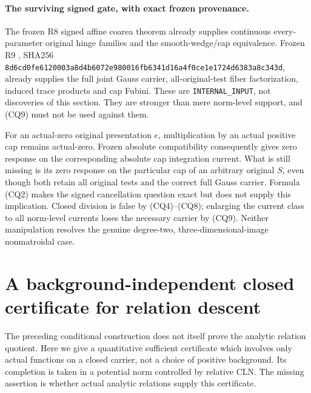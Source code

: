 \documentclass[11pt,a4paper]{article}
\numberwithin{equation}{section}
\theoremstyle{definition}
\theoremstyle{remark}
\begin{document}
\paragraph{The surviving signed gate, with exact frozen provenance.}
The frozen R8 signed affine coarea theorem already supplies
continuous every-parameter original hinge families and the
smooth-wedge/cap equivalence. Frozen R9
,
SHA256
{\small\nolinkurl{8d6cd0fe6120003a8d4b6072e980016fb6341d16a4f0ce1e1724d6383a8c343d}},
already supplies the full joint Gauss carrier, all-original-test
fiber factorization, induced trace products and cap Fubini.
These are \texttt{INTERNAL\_INPUT}, not discoveries of this section.
They are stronger than mere norm-level support, and (CQ9) must not
be used against them.

For an actual-zero original presentation \(e\), multiplication
by an actual positive cap remains actual-zero. Frozen absolute
compatibility consequently gives zero response on the corresponding
absolute cap integration current. What is still missing is its
zero response on the particular cap of an arbitrary original
\(S\), even though both retain all original tests and the correct
full Gauss carrier. Formula (CQ2) makes the signed cancellation
question exact but does not supply this implication. Closed
division is false by (CQ4)--(CQ8); enlarging the current class to
all norm-level currents loses the necessary carrier by (CQ9).
Neither manipulation resolves the genuine degree-two,
three-dimensional-image nonmatroidal case.



\section{A background-independent closed certificate for relation descent}
\label{sec:r12-carrier-cln-certificates}

The preceding conditional construction does not itself prove the
analytic relation quotient. Here we give a quantitative sufficient
certificate which involves only actual functions on a closed carrier,
not a choice of positive background. Its completion is taken in a
potential norm controlled by relative CLN. The missing assertion is
whether actual analytic relations supply this certificate.
\end{document}
